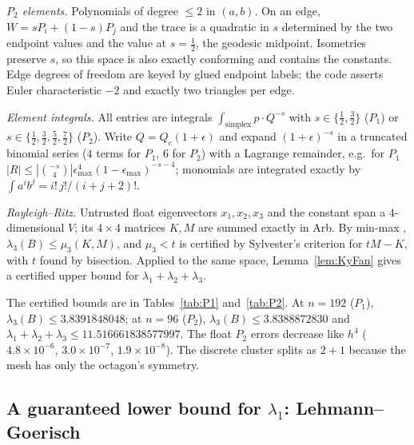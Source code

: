 \documentclass[11pt]{amsart}
\theoremstyle{definition}
\theoremstyle{remark}
\begin{document}
\emph{$P_2$ elements.} Polynomials of degree $\le2$ in $(a,b)$. On an edge, $W=sP_i+(1-s)P_j$ and
the trace is a quadratic in $s$ determined by the two endpoint values and the value at $s=\frac12$,
the geodesic midpoint. Isometries preserve $s$, so this space is also exactly conforming and
contains the constants. Edge degrees of freedom are keyed by glued endpoint labels; the code
asserts Euler characteristic $-2$ and exactly two triangles per edge.

\emph{Element integrals.} All entries are integrals $\int_{\text{simplex}}p\cdot Q^{-s}$ with
$s\in\{\tfrac12,\tfrac32\}$ ($P_1$) or $s\in\{\tfrac12,\tfrac32,\tfrac52,\tfrac72\}$ ($P_2$). Write
$Q=Q_c(1+\epsilon)$ and expand $(1+\epsilon)^{-s}$ in a truncated binomial series ($4$ terms for $P_1$, $6$
for $P_2$) with a Lagrange remainder, e.g.\ for $P_1$
$|R|\le|\binom{-s}{4}|\epsilon_{\max}^4(1-\epsilon_{\max})^{-s-4}$; monomials are integrated exactly by
$\int a^ib^j=i!\,j!/(i+j+2)!$.

\emph{Rayleigh--Ritz.} Untrusted float eigenvectors $x_1,x_2,x_3$ and the constant span a
$4$-dimensional $V$; its $4\times4$ matrices $K,M$ are summed exactly in Arb. By min-max
\cite[Thm.~1.22]{Coo18}, $\lambda_3(B)\le\mu_3(K,M)$, and $\mu_3<t$ is certified by Sylvester's
criterion for $tM-K$, with $t$ found by bisection. Applied to the same space, Lemma~\ref{lem:KyFan} gives a certified upper bound for
$\lambda_1+\lambda_2+\lambda_3$.

The certified bounds are in Tables~\ref{tab:P1} and~\ref{tab:P2}. At $n=192$ ($P_1$),
$\lambda_3(B)\le3.8391848048$; at $n=96$ ($P_2$), $\lambda_3(B)\le3.8388872830$ and
$\lambda_1+\lambda_2+\lambda_3\le11.516661838577997$. The float $P_2$ errors decrease like $h^4$
($4.8\times10^{-6}$, $3.0\times10^{-7}$, $1.9\times10^{-8}$). The discrete cluster splits as $2+1$
because the mesh has only the octagon's symmetry.

\subsection{A guaranteed lower bound for \texorpdfstring{$\lambda_1$}{lambda1}: Lehmann--Goerisch}\label{subsec:LG}
\end{document}
